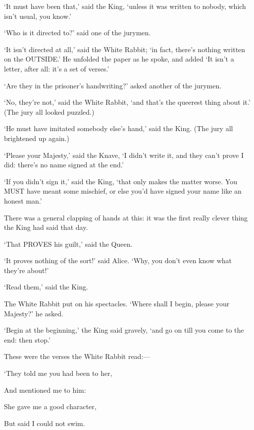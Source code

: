 \documentclass[12pt]{article}
\begin{document}
\begin{Parallel}[p]{}{}
{‘It must have been that,’ said the King, ‘unless it was written to nobody, which isn’t usual, you know.’

‘Who is it directed to?’ said one of the jurymen.

‘It isn’t directed at all,’ said the White Rabbit; ‘in fact, there’s nothing written on the OUTSIDE.’ He unfolded the paper as he spoke, and added ‘It isn’t a letter, after all: it’s a set of verses.’

‘Are they in the prisoner’s handwriting?’ asked another of the jurymen.

‘No, they’re not,’ said the White Rabbit, ‘and that’s the queerest thing about it.’ (The jury all looked puzzled.)

‘He must have imitated somebody else’s hand,’ said the King. (The jury all brightened up again.)

‘Please your Majesty,’ said the Knave, ‘I didn’t write it, and they can’t prove I did: there’s no name signed at the end.’

‘If you didn’t sign it,’ said the King, ‘that only makes the matter worse. You MUST have meant some mischief, or else you’d have signed your name like an honest man.’

There was a general clapping of hands at this: it was the first really clever thing the King had said that day.

‘That PROVES his guilt,’ said the Queen.

‘It proves nothing of the sort!’ said Alice. ‘Why, you don’t even know what they’re about!’

‘Read them,’ said the King.

The White Rabbit put on his spectacles. ‘Where shall I begin, please your Majesty?’ he asked.

‘Begin at the beginning,’ the King said gravely, ‘and go on till you come to the end: then stop.’

These were the verses the White Rabbit read:—\\
\par

{\setlength{\parskip}{0em}
\par\quad ‘They told me you had been to her,
\par\quad\quad And mentioned me to him:
\par\quad She gave me a good character,
\par\quad\quad But said I could not swim.
}\\
\par

}
\end{Parallel}
\end{document}
